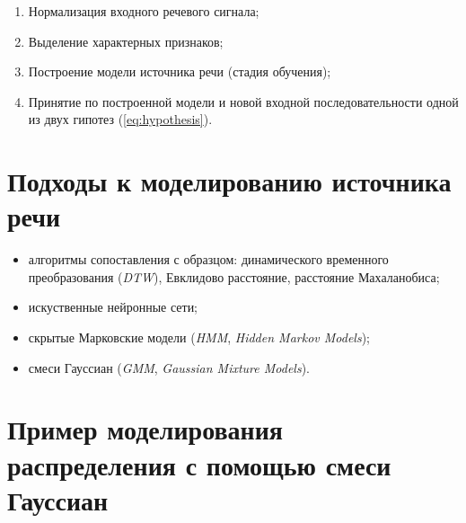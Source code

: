 \documentclass[12pt]{article}
\begin{document}
\begin{enumerate}
\item Нормализация входного речевого сигнала;
\item Выделение характерных признаков;
\item Построение модели источника речи (стадия обучения);
\item Принятие по построенной модели и новой входной последовательности одной из двух гипотез (\ref{eq:hypothesis}).
\end{enumerate}

\section{Подходы к моделированию источника речи}

\begin{itemize}
\item алгоритмы сопоставления с образцом: динамического временного преобразования (\emph{DTW}), Евклидово расстояние, расстояние Махаланобиса;
\item искуственные нейронные сети;
\item скрытые Марковские модели (\emph{HMM}, \emph{Hidden Markov Models});
\item смеси Гауссиан (\emph{GMM}, \emph{Gaussian Mixture Models}).
\end{itemize}





\section{Пример моделирования распределения с помощью смеси Гауссиан}
\end{document}
